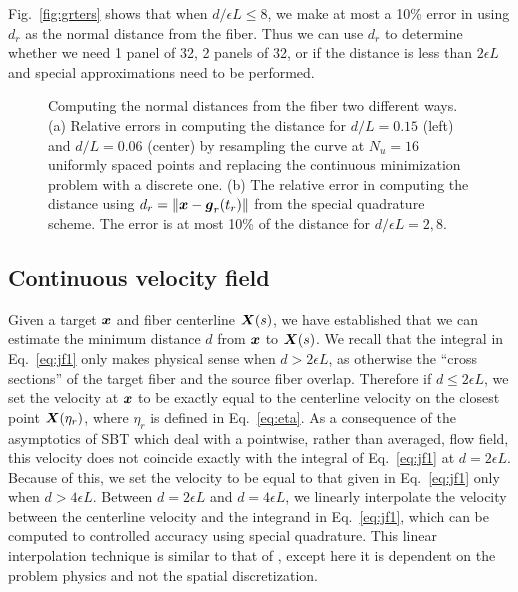 Fig.\ \ref{fig:grters} shows that when $d/\epsilon L \leq 8$, we make at most a 10\% error in using $d_r$ as the normal distance from the fiber. Thus we can use $d_r$ to determine whether we need 1 panel of 32, 2 panels of 32, or if the distance is less than $2\epsilon L$ and special approximations need to be performed. 

\begin{figure}
\centering
{}
\caption{Computing the normal distances from the fiber two different ways. (a) Relative errors in computing the distance for $d/L = 0.15$ (left) and $d/L= 0.06$ (center) by resampling the curve at $N_u=16$ uniformly spaced points and replacing the continuous minimization problem with a discrete one. (b) The relative error in computing the distance using $d_r=\left\Vert \boldsymbol{x}-\boldsymbol{g}_r(t_r)\right\Vert$ from the special quadrature scheme. The error is at most 10\% of the distance for $d/\epsilon L = 2, 8$.   }
\end{figure}

\subsection{Continuous velocity field \label{sec:contvel}}
Given a target $\boldsymbol{x}$ and fiber centerline $\boldsymbol{X}(s)$, we have established that we can estimate the minimum distance $d$ from $\boldsymbol{x}$ to $\boldsymbol{X}(s)$. We recall that the integral in Eq.\ \eqref{eq:jf1} only makes physical sense when $d > 2\epsilon L$, as otherwise the ``cross sections'' of the target fiber and the source fiber overlap. Therefore if $d \leq 2 \epsilon L$, we set the velocity at $\boldsymbol{x}$ to be exactly equal to the centerline velocity on the closest point $\boldsymbol{X}(\eta_r)$, where $\eta_r$ is defined in Eq.\ \eqref{eq:eta}. As a consequence of the asymptotics of SBT which deal with a pointwise, rather than averaged, flow field, this velocity does not coincide exactly with the integral of Eq.\ \eqref{eq:jf1} at $d=2\epsilon L$. Because of this, we set the velocity to be equal to that given in Eq.\ \eqref{eq:jf1} only when $d > 4\epsilon L$. Between $d=2\epsilon L$ and $d=4 \epsilon L$, we linearly interpolate the velocity between the centerline velocity and the integrand in Eq.\ \eqref{eq:jf1}, which can be computed to controlled accuracy using special quadrature. This linear interpolation technique is similar to that of \cite{ts04}, except here it is dependent on the problem physics and not the spatial discretization. 

